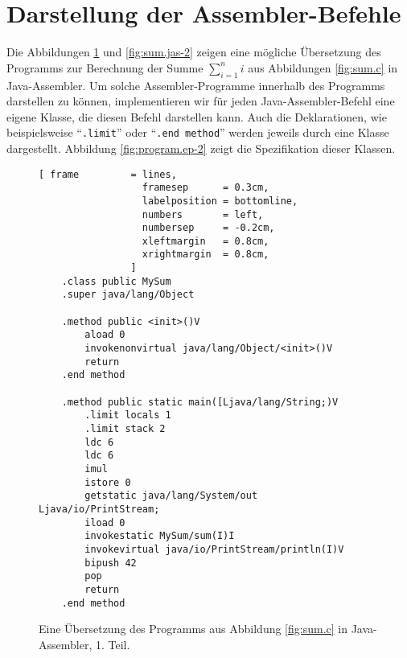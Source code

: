 \section{Darstellung der Assembler-Befehle}
Die Abbildungen \ref{fig:sum.jas} und \ref{fig:sum.jas-2} zeigen eine m\"ogliche \"Ubersetzung
des Programms zur Berechnung der Summe $\sum_{i=1}^n i$ aus Abbildungen \ref{fig:sum.c}
in Java-Assembler.  Um solche Assembler-Programme innerhalb des Programms darstellen zu
k\"onnen, implementieren wir f\"ur jeden Java-Assembler-Befehl eine eigene Klasse, die diesen
Befehl darstellen kann.   Auch die Deklarationen, wie beispielsweise 
``\texttt{.limit}'' oder ``\texttt{.end method}'' werden jeweils durch eine Klasse
dargestellt.  Abbildung \ref{fig:program.ep-2} zeigt die Spezifikation dieser Klassen.  

\begin{figure}[!ht]
\centering
\begin{Verbatim}[ frame         = lines, 
                  framesep      = 0.3cm, 
                  labelposition = bottomline,
                  numbers       = left,
                  numbersep     = -0.2cm,
                  xleftmargin   = 0.8cm,
                  xrightmargin  = 0.8cm,
                ]
    .class public MySum
    .super java/lang/Object
    
    .method public <init>()V
        aload 0
        invokenonvirtual java/lang/Object/<init>()V
        return
    .end method
    
    .method public static main([Ljava/lang/String;)V
        .limit locals 1
        .limit stack 2
        ldc 6
        ldc 6
        imul
        istore 0
        getstatic java/lang/System/out Ljava/io/PrintStream;
        iload 0
        invokestatic MySum/sum(I)I
        invokevirtual java/io/PrintStream/println(I)V
        bipush 42
        pop
        return
    .end method
\end{Verbatim}
\vspace*{-0.3cm}
\caption{Eine \"Ubersetzung des Programms aus Abbildung \ref{fig:sum.c} in
  Java-Assembler, 1. Teil.}
\label{fig:sum.jas}
\end{figure}

